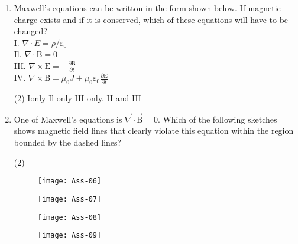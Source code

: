 \begin{enumerate}
	 \begin{tasks}(1)
		\task[\textbf{a.}]stored entirely in its magnetic field.
		\task[\textbf{b.}] stored entirely in its electric field.
		\task[\textbf{c.}]distributed equally among its electric and magnetic fields.
		\task[\textbf{d.}]  radiated out of the circuit.
	\end{tasks}
\item 	Maxwell's equations can be writton in the form shown below. If magnetic charge exists and if it is conserved, which of these equations will have to be changed?\\
I. $\nabla \cdot E=\rho / \varepsilon_{0}$\\
Il. $\nabla \cdot \mathrm{B}=0$\\
III. $\nabla \times \mathrm{E}=-\frac{\partial \mathrm{B}}{\partial t}$\\
IV. $\nabla \times \mathrm{B}=\mu_{0} J+\mu_{0} \varepsilon_{0} \frac{\partial \mathrm{E}}{\partial t}$
	 \begin{tasks}(2)
		\task[\textbf{a.}] Ionly
		\task[\textbf{b.}]Il only
		\task[\textbf{c.}]III only.
		\task[\textbf{d.}]II and III 
	\end{tasks}
\item One of Maxwell's equations is $\vec{\nabla} \cdot \overrightarrow{\mathrm{B}}=0$. Which of the following sketches shows magnetic field lines that clearly violate this equation within the region bounded by the dashed lines?	 
  \begin{tasks}(2)
 	\task[\textbf{a.}]
 	\begin{figure}[H]
 		\centering
 		\texttt{[image: Ass-06]}
 	\end{figure}
 	\task[\textbf{b.}]	\begin{figure}[H]
 		\centering
 		\texttt{[image: Ass-07]}
 	\end{figure}
 	\task[\textbf{c.}]	\begin{figure}[H]
 		\centering
 		\texttt{[image: Ass-08]}
 	\end{figure}
 	\task[\textbf{d.}] 	\begin{figure}[H]
 		\centering
 		\texttt{[image: Ass-09]}
 	\end{figure}
 \end{tasks}
	
	
	
	
	
	
	
	
	
	
	
	
	
	
	
	
	
	
	
	
\end{enumerate}












